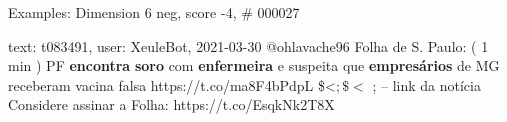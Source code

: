 \begin{frame}{Examples: Dimension 6 neg, score -4, \# 000027}
\footnotesize
\begin{alertblock}{text: t083491, user: XeuleBot, 2021-03-30}
@ohlavache96 Folha de S. Paulo: ( 1 min ) PF \textbf{encontra} \textbf{soro} 
com \textbf{enfermeira} e suspeita que \textbf{empresários} de MG receberam 
vacina falsa https://t.co/ma8F4bPdpL \$<$ ; \$<$ ; -- link da notícia Considere 
assinar a Folha: https://t.co/EsqkNk2T8X 
\end{alertblock}
\end{frame}
